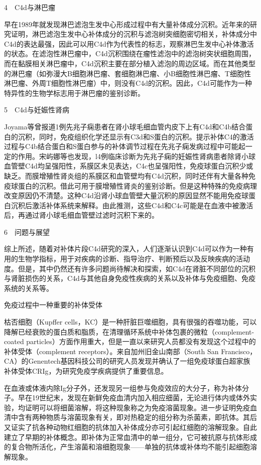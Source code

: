 4　C4d与淋巴瘤

早在1989年就发现淋巴滤泡生发中心形成过程中有大量补体成分沉积。近年来的研究证明，淋巴滤泡生发中心补体成分的沉积与滤泡树突细胞密切相关，补体成分中C4d的表达最强，因此可以用C4d作为代表性的标志，观察淋巴生发中心补体激活的状态。在滤泡性淋巴瘤中，C4d沉积围绕在瘤性滤泡中的滤泡树突状细胞周围，而在黏膜相关淋巴瘤中，C4d沉积主要在部分植入滤泡的周边区域。而在其他类型的淋巴瘤（如弥漫大B细胞淋巴瘤、套细胞淋巴瘤、小B细胞性淋巴瘤、T细胞性淋巴瘤、外周T细胞性淋巴瘤）中，则没有C4d的沉积。因此，C4d可能作为一种特异性的生物学标志用于淋巴瘤的鉴别诊断。

5　C4d与妊娠性肾病

Joyama等曾报道1例先兆子痫患者在肾小球毛细血管内皮下上有C4d和C4b结合蛋白的沉积，同时，免疫组织化学还显示有C3d和S蛋白的沉积。提示补体C4的激活过程与C4b结合蛋白和S蛋白参与的补体调节过程在先兆子痫发病过程中可能起一定的作用。宋屿娜等也发现，l4例临床诊断为先兆子痫的妊娠性肾病患者除肾小球血管壁C4d均呈强阳性，系膜区未见表达，C4c也呈强阳性，免疫球蛋白沉积少或缺乏。而膜增殖性肾炎组的系膜区和血管壁均有C4d沉积，同时还伴有大量各种免疫球蛋白的沉积。借此可用于膜增殖性肾炎的鉴别诊断。但是这种特殊的免疫病理改变原因仍不清楚。这种C4d沿肾小球血管壁大量沉积的原因显然不能用免疫球蛋白沉积后激活补体系统来解释。由此推测，这些C4d和C4c可能是在血液中被激活后，再通过肾小球毛细血管壁过滤时沉积下来的。

6　问题与展望

综上所述，随着对补体片段C4d研究的深入，人们逐渐认识到C4d可以作为一种有用的生物学指标，用于对疾病的诊断、指导治疗、判断预后以及反映疾病的活动度。但是，其中仍然还有许多问题尚待解决和探索，如C4d在肾脏不同部位的沉积与肾脏损伤的关系，C4d与其他自身免疫性疾病的关系以及补体与免疫细胞、免疫系统的关系等。

\begin{center}
{\Large 免疫过程中一种重要的补体受体}
\end{center}

枯否细胞（Kupffer
cells，KC）是一种肝脏巨噬细胞，具有很强的吞噬功能，可以降解已经衰败的蛋白质和脂质，在清理循环系统中补体包裹的微粒（complement-coated
particles）方面作用重大，但是一直以来研究人员都没有发现这个过程中的补体受体（complement
receptors）。来自加州旧金山南部（South San
Francisco，CA）的Genentech基因科技公司的研究人员发现并确认了一组免疫球蛋白超家族补体受体CRIg，为研究免疫学疾病提供了重要信息。

在血液或体液内除Ig分子外，还发现另一组参与免疫效应的大分子，称为补体分子。早在19世纪末，发现在新鲜免疫血清内加入相应细菌，无论进行体内或体外实验，均证明可以将细菌溶解，将这种现象称之为免疫溶菌现象。进一步证明免疫血清中含有两种物质与溶菌现象有关，即对热稳定的组分称为杀菌素，即抗体。其后又证实了抗各种动物红细胞的抗体加入补体成分亦可引起红细胞的溶解现象。自此建立了早期的补体概念。即补体为正常血清中的单一组分，它可被抗原与抗体形成的复合物所活化，产生溶菌和溶细胞现象------单独的抗体或补体均不能引起细胞溶解现象。

